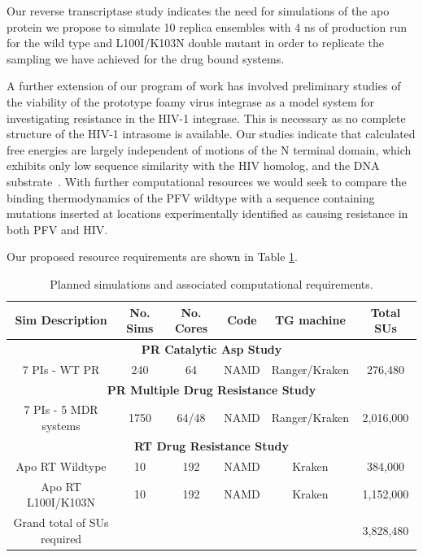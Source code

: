 \documentclass[a4paper,11pt]{article}
\begin{document}
Our reverse transcriptase study indicates the need for simulations of the apo protein we propose to simulate 
10 replica ensembles with 4 ns of production run for the wild type and L100I/K103N double mutant in order to 
replicate the sampling we have achieved for the drug bound systems. 

A further extension of our program of work has involved preliminary studies of the viability of the prototype foamy virus integrase as a model system for investigating resistance in the HIV-1 integrase. This is necessary as no complete structure of the HIV-1 intrasome is available. Our studies indicate that calculated free energies are largely independent of motions of the N terminal domain, which exhibits only low sequence similarity with the HIV homolog, and the DNA substrate~\cite{Ref5}. With further computational resources we would seek to compare the binding thermodynamics of the PFV wildtype with a sequence containing mutations inserted at locations experimentally identified as causing resistance in both PFV and HIV.

Our proposed resource requirements are shown in Table \ref{t:hiv_req}.

\begin{table}[h]
\centering
\begin{tabular}[b]
{|c|c|c|c|c|c|}
\hline
\textbf{Sim Description} & \textbf{No. Sims} &
\textbf{No. Cores} & \textbf{Code} & \textbf{TG machine} & \textbf{Total SUs}\\
\hline
\multicolumn{6}{|c|}{\textbf{PR Catalytic Asp Study}}\\
\hline
7 PIs - WT PR & 240 & 64 & NAMD & Ranger/Kraken & 276,480 \\
\hline
\multicolumn{6}{|c|}{\textbf{PR Multiple Drug Resistance Study}}\\
\hline
7 PIs - 5 MDR systems & 1750 & 64/48 & NAMD & Ranger/Kraken & 2,016,000 \\
\hline
\multicolumn{6}{|c|}{\textbf{RT Drug Resistance Study}}\\
\hline
Apo RT Wildtype & 10 & 192 & NAMD & Kraken & 384,000\\
\hline
Apo RT L100I/K103N & 10 & 192 & NAMD & Kraken & 1,152,000\\
\hline
Grand total of SUs required & & & & & 3,828,480\\
\hline
\end{tabular} \caption{Planned simulations and associated computational requirements.}
\label{t:hiv_req}
\end{table}
\end{document}
